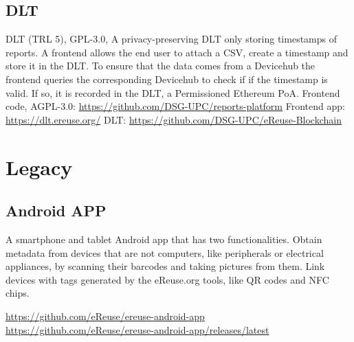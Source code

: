 \documentclass[
]{book}
\begin{document}
\hypertarget{dlt}{%
\subsection{DLT}\label{dlt}}

DLT (TRL 5), GPL-3.0, A privacy-preserving DLT only storing timestamps of reports. A frontend allows the end user to attach a CSV, create a timestamp and store it in the DLT. To ensure that the data comes from a Devicehub the frontend queries the corresponding Devicehub to check if if the timestamp is valid. If so, it is recorded in the DLT, a Permissioned Ethereum PoA.
Frontend code, AGPL-3.0: \url{https://github.com/DSG-UPC/reports-platform}
Frontend app: \url{https://dlt.ereuse.org/}
DLT: \url{https://github.com/DSG-UPC/eReuse-Blockchain}

\hypertarget{legacy}{%
\section{Legacy}\label{legacy}}

\hypertarget{android-app}{%
\subsection{Android APP}\label{android-app}}

A smartphone and tablet Android app that has two functionalities.
Obtain metadata from devices that are not computers, like peripherals or electrical appliances, by scanning their barcodes and taking pictures from them.
Link devices with tags generated by the eReuse.org tools, like QR codes and NFC chips.

\url{https://github.com/eReuse/ereuse-android-app}
\url{https://github.com/eReuse/ereuse-android-app/releases/latest}

  
\end{document}
